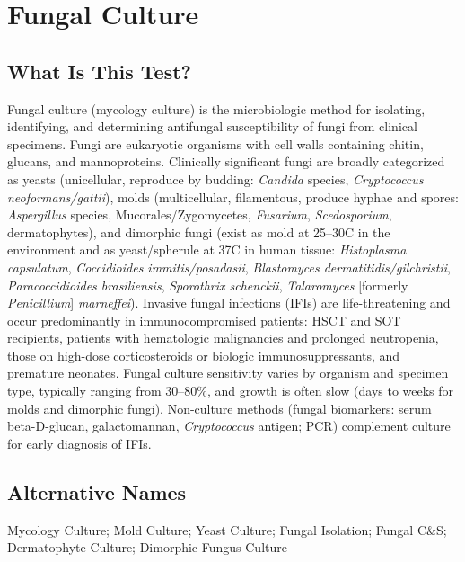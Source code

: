 \chapter{Fungal Culture}

\section*{What Is This Test?}
Fungal culture (mycology culture) is the microbiologic method for isolating, identifying, and determining antifungal susceptibility of fungi from clinical specimens. Fungi are eukaryotic organisms with cell walls containing chitin, glucans, and mannoproteins. Clinically significant fungi are broadly categorized as yeasts (unicellular, reproduce by budding: \textit{Candida} species, \textit{Cryptococcus neoformans/gattii}), molds (multicellular, filamentous, produce hyphae and spores: \textit{Aspergillus} species, Mucorales/Zygomycetes, \textit{Fusarium}, \textit{Scedosporium}, dermatophytes), and dimorphic fungi (exist as mold at 25--30\textdegree{}C in the environment and as yeast/spherule at 37\textdegree{}C in human tissue: \textit{Histoplasma capsulatum}, \textit{Coccidioides immitis/posadasii}, \textit{Blastomyces dermatitidis/gilchristii}, \textit{Paracoccidioides brasiliensis}, \textit{Sporothrix schenckii}, \textit{Talaromyces} [formerly \textit{Penicillium}] \textit{marneffei}). Invasive fungal infections (IFIs) are life-threatening and occur predominantly in immunocompromised patients: HSCT and SOT recipients, patients with hematologic malignancies and prolonged neutropenia, those on high-dose corticosteroids or biologic immunosuppressants, and premature neonates. Fungal culture sensitivity varies by organism and specimen type, typically ranging from 30--80\%, and growth is often slow (days to weeks for molds and dimorphic fungi). Non-culture methods (fungal biomarkers: serum beta-D-glucan, galactomannan, \textit{Cryptococcus} antigen; PCR) complement culture for early diagnosis of IFIs.

\section*{Alternative Names}
Mycology Culture; Mold Culture; Yeast Culture; Fungal Isolation; Fungal C\&S; Dermatophyte Culture; Dimorphic Fungus Culture

